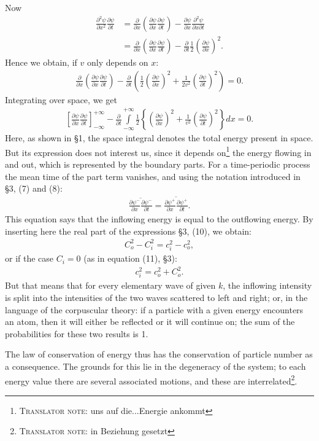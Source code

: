 \documentclass[a4paper,11pt]{article}
\newcommand{\?}[2]{#1\footnote{\textsc{Translator note}: #2}}
\newcommand{\nequ}[2]{\begin{align*}\tag{#1}#2\end{align*}}
\newcommand{\uequ}[1]{\begin{align*}#1\end{align*}}
\newcommand{\pXpY}[2]{\frac{\partial #1}{\partial #2}}
\newcommand{\ppXpYY}[2]{\frac{\partial^2 #1}{\partial {#2}^2}}
\begin{document}
Now
\uequ{
\ppXpYY{\psi}{x}\pXpY{\psi}{t} 
& = \pXpY{}{x}\left(\pXpY{\psi}{x}\pXpY{\psi}{t}\right) - \pXpY{\psi
}{x}\frac{\partial^2 \psi}{\partial x \partial t}\\
& = \pXpY{}{x}\left(\pXpY{\psi}{x}\pXpY{\psi}{t}\right) - \pXpY{
}{t}\frac{1}{2}\left(\pXpY{\psi}{x}\right)^2.
}
Hence we obtain, if $v$ only depends on $x$:
\nequ{3}{
\pXpY{}{x}\left(\pXpY{\psi}{x}\pXpY{\psi}{t}\right) - 
\pXpY{}{t}\left(\frac{1}{2}\left(\pXpY{\psi}{x}\right)^2 + \frac{1}{2v^2}\left(\pXpY{\psi}{t}\right)^2\right) = 0.
}
Integrating over space, we get
\nequ{4}{
\left[\pXpY{\psi}{x}\pXpY{\psi}{t}\right]_{-\infty}^{+\infty} - 
\pXpY{}{t}\int\limits_{-\infty}^{+\infty}\frac{1}{2}\left\{\left(\pXpY{\psi}{x}\right)^2 + \frac{1}{v^2}\left(\pXpY{\psi}{t}\right)^2\right\}dx = 0.
}
Here, as shown in \S1, the space integral denotes the total energy present in space. But its expression does not interest us, since it \?{depends on}{uns auf die...Energie ankommt} the energy flowing in and out, which is represented by the boundary parts. For a time-periodic process the mean time of the part term vanishes, and using the notation introduced in \S3, (7) and (8):
\nequ{5}{
\overline{\pXpY{\psi^-}{x}\pXpY{\psi^-}{t}}
= \overline{\pXpY{\psi^+}{x}\pXpY{\psi^+}{t}}.
}
This equation says that the inflowing energy is equal to the outflowing energy. By inserting here the real part of the expressions \S3, (10), we obtain:
\nequ{6}{C_o^2 -C_i^2 = c_i^2- c_o^2,}
or if the case $C_i=0$ (as in equation (11), \S3):
\nequ{7}{c_i^2 = c_o^2 + C_o^2.}
But that means that for every elementary wave of given $k$, the inflowing intensity is split into the intensities of the two waves scattered to left and right; or, in the language of the corpuscular theory: if a particle with a given energy encounters an atom, then it will either be reflected or it will continue on; the sum of the probabilities for these two results is 1.

The law of conservation of energy thus has the conservation of particle number as a consequence. The grounds for this lie in the degeneracy of the system; to each energy value there are several associated motions, and these \?{are interrelated}{in Beziehung gesetzt}.
\end{document}
